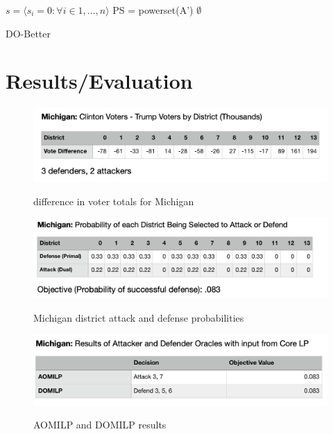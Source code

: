 \documentclass[letterpaper]{article} %
\begin{document}
\begin{algorithm}
\SetAlgoLined
{}
$s =  \langle s_{i} = 0: \forall i \in {1,...,n}\rangle$\; 
PS = powerset(A')\;
\Return $\emptyset$
 \caption{DO-Better}
\end{algorithm}



\section{Results/Evaluation}

\begin{figure}
    \includegraphics[width=\linewidth]{michigan_votes}
    \label{michigan_votes}
    \caption{difference in voter totals for Michigan}
\end{figure}

\begin{figure}
    \includegraphics[width=\linewidth]{michigan_probs}
    \label{michigan_probs}
   \caption{Michigan district attack and defense probabilities}
\end{figure}

\begin{figure}
    \includegraphics[width=\linewidth]{michigan_oracles}
    \label{michigan_oracles}
    \caption{AOMILP and DOMILP results}
\end{figure}
\end{document}

